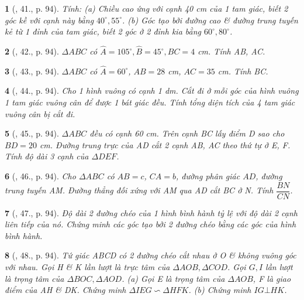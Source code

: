 \documentclass{article}
\newtheorem{baitoan}{}
\begin{document}
\begin{baitoan}[\cite{Binh_Toan_9_tap_1}, 41., p. 94]
	Tính: (a) Chiều cao ứng với cạnh {\rm40 cm} của 1 tam giác, biết 2 góc kề với cạnh này bằng $40^\circ,55^\circ$. (b) Góc tạo bởi đường cao \& đường trung tuyến kẻ từ 1 đỉnh của tam giác, biết 2 góc ở 2 đỉnh kia bằng $60^\circ,80^\circ$.
\end{baitoan}

\begin{baitoan}[\cite{Binh_Toan_9_tap_1}, 42., p. 94]
	$\Delta ABC$ có $\widehat{A} = 105^\circ,\widehat{B} = 45^\circ, BC = 4$ {\rm cm}. Tính AB, AC.
\end{baitoan}

\begin{baitoan}[\cite{Binh_Toan_9_tap_1}, 43., p. 94]
	$\Delta ABC$ có $\widehat{A} = 60^\circ$, $AB = 28$ {\rm cm}, $AC = 35$ {\rm cm}. Tính BC.
\end{baitoan}

\begin{baitoan}[\cite{Binh_Toan_9_tap_1}, 44., p. 94]
	Cho 1 hình vuông có cạnh {\rm1 dm}. Cắt đi ở mỗi góc của hình vuông 1 tam giác vuông cân để được 1 bát giác đều. Tính tổng diện tích của 4 tam giác vuông cân bị cắt đi.
\end{baitoan}

\begin{baitoan}[\cite{Binh_Toan_9_tap_1}, 45., p. 94]
	$\Delta ABC$ đều có cạnh {\rm60 cm}. Trên cạnh BC lấy điểm D sao cho $BD = 20$ {\rm cm}. Đường trung trực của AD cắt 2 cạnh AB, AC theo thứ tự ở E, F. Tính độ dài 3 cạnh của $\Delta DEF$.
\end{baitoan}

\begin{baitoan}[\cite{Binh_Toan_9_tap_1}, 46., p. 94]
	Cho $\Delta ABC$ có $AB = c$, $CA = b$, đường phân giác $AD$, đường trung tuyến AM. Đường thẳng đối xứng với AM qua AD cắt BC ở N. Tính $\dfrac{BN}{CN}$.
\end{baitoan}

\begin{baitoan}[\cite{Binh_Toan_9_tap_1}, 47., p. 94]
	Độ dài 2 đường chéo của 1 hình bình hành tỷ lệ với độ dài 2 cạnh liên tiếp của nó. Chứng minh các góc tạo bởi 2 đường chéo bằng các góc của hình bình hành.
\end{baitoan}

\begin{baitoan}[\cite{Binh_Toan_9_tap_1}, 48., p. 94]
	Tứ giác ABCD có 2 đường chéo cắt nhau ở O \& không vuông góc với nhau. Gọi H \& K lần lượt là trực tâm của $\Delta AOB,\Delta COD$. Gọi $G,I$ lần lượt là trọng tâm của $\Delta BOC,\Delta AOD$. (a) Gọi E là trọng tâm của $\Delta AOB$, F là giao điểm của AH \& DK. Chứng minh $\Delta IEG\backsim\Delta HFK$. (b) Chứng minh $IG\bot HK$.
\end{baitoan}
\end{document}
